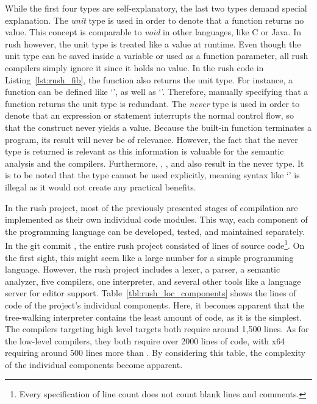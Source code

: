 While the first four types are self-explanatory, the last two types demand special explanation.
The \emph{unit} type is used in order to denote that a function returns no value.
This concept is comparable to \emph{void} in other languages, like C or Java.
In rush however, the unit type is treated like a value at runtime.
Even though the unit type can be saved inside a variable or used as a function parameter, all rush compilers simply ignore it since it holds no value.
In the rush code in Listing~\ref{lst:rush_fib}, the  function also returns the unit type.
For instance, a function  can be defined like `', as well as `'.
Therefore, manually specifying that a function returns the unit type is redundant.
The \emph{never} type is used in order to denote that an expression or statement interrupts the normal control flow, so that the construct never yields a value.
Because the built-in  function terminates a program, its result will never be of relevance.
However, the fact that the never type is returned is relevant as this information is valuable for the semantic analysis and the compilers.
Furthermore, , , and  also result in the never type.
It is to be noted that the type cannot be used explicitly, meaning syntax like `' is illegal as it would not create any practical benefits.

In the rush project, most of the previously presented stages of compilation are implemented as their own individual code modules.
This way, each component of the programming language can be developed, tested, and maintained separately.
In the git commit \rushCommit{}, the entire rush project consisted of
lines of source code\footnote{Every specification of line count does not count blank lines and comments.}.
On the first sight, this might seem like a large number for a simple programming language.
However, the rush project includes a lexer, a parser, a semantic analyzer, five compilers, one interpreter, and several other tools like a language server for editor support.
Table~\ref{tbl:rush_loc_components} shows the lines of code of the project's individual components.
Here, it becomes apparent that the tree-walking interpreter contains the least amount of code, as it is the simplest.
The compilers targeting high level targets both require around 1,500 lines.
As for the low-level compilers, they both require over 2000 lines of code, with x64 requiring around 500 lines more than \riscv{}.
By considering this table, the complexity of the individual components become apparent.
